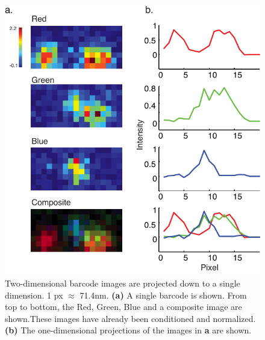 	\begin{figure}[htbp]
	\begin{center}
		\includegraphics[width=\textwidth]{figures/theoryProjectBarcode}
		\caption{Two-dimensional barcode images are projected down to a single dimension. 1 px $\approx$ 71.4nm. \textbf{(a)}  A single barcode is shown. From top to bottom, the Red, Green,  Blue and a composite image are shown.These images have already been conditioned and normalized. \textbf{(b)} The one-dimensional projections of the images in \textbf{a} are shown. \label{fig:fig:projectDown}}
	\end{center}	
	\end{figure}



